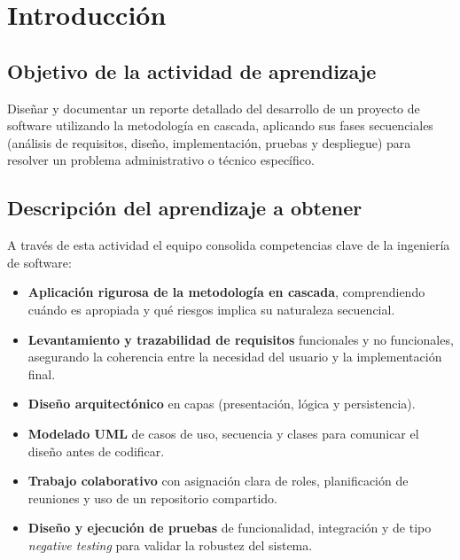 \documentclass[11pt,letterpaper,oneside]{article}
\begin{document}
\setcounter{page}{2}
{\sffamily
  \renewcommand{\contentsname}{\color{uvblue}\Large\bfseries Índice}
  \tableofcontents
}
\newpage

\setcounter{page}{1}

\section{Introducción}

\subsection{Objetivo de la actividad de aprendizaje}

Diseñar y documentar un reporte detallado del desarrollo de un proyecto de software utilizando la metodología en cascada, aplicando sus fases secuenciales (análisis de requisitos, diseño, implementación, pruebas y despliegue) para resolver un problema administrativo o técnico específico.

\subsection{Descripción del aprendizaje a obtener}

A través de esta actividad el equipo consolida competencias clave de la ingeniería de software:

\begin{itemize}[leftmargin=1.5em,itemsep=2pt]
  \item \textbf{Aplicación rigurosa de la metodología en cascada}, comprendiendo cuándo es apropiada y qué riesgos implica su naturaleza secuencial.
  \item \textbf{Levantamiento y trazabilidad de requisitos} funcionales y no funcionales, asegurando la coherencia entre la necesidad del usuario y la implementación final.
  \item \textbf{Diseño arquitectónico} en capas (presentación, lógica y persistencia).
  \item \textbf{Modelado UML} de casos de uso, secuencia y clases para comunicar el diseño antes de codificar.
  \item \textbf{Trabajo colaborativo} con asignación clara de roles, planificación de reuniones y uso de un repositorio compartido.
  \item \textbf{Diseño y ejecución de pruebas} de funcionalidad, integración y de tipo \emph{negative testing} para validar la robustez del sistema.
\end{itemize}
\end{document}
